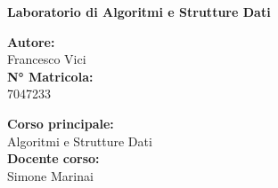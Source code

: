 

\begin{titlepage}
	
	
	\HR
	
	\begin{CENTER}
		\textbf{ Laboratorio di Algoritmi e Strutture Dati}
	\end{CENTER}
	
	\HR
	
	\vspace{3em}

	\begin{MINIBOX}
		
		\textbf{Autore:}\\
		Francesco Vici\\[1.2em]
		\textbf{N° Matricola:}\\
		7047233	\\[1.2em]
		
	
	\end{MINIBOX}
	\hfill
	\begin{MINIBOX-RIGHT}
		
		\textbf{Corso principale:} \\
		Algoritmi e Strutture Dati\\[1.2em]
		\textbf{Docente corso:}\\
		Simone Marinai\\[1.2em]
		
	\end{MINIBOX-RIGHT}	
		

	
\end{titlepage}


\newpage

\tableofcontents 

\newpage
